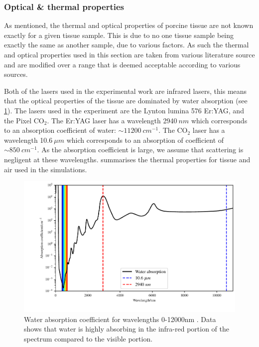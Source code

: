 \subsubsection{Optical \& thermal properties}

As mentioned, the thermal and optical properties of porcine tissue are not known exactly for a given tissue sample. This is due to no one tissue sample being exactly the same as another sample, due to various factors. As such the thermal and optical properties used in this section are taken from various literature source and are modified over a range that is deemed acceptable according to various sources.

Both of the lasers used in the experimental work are infrared lasers, this means that the optical properties of the tissue are dominated by water absorption (see \cref{fig:waterabsor}). The lasers used in the experiment are the Lynton lumina 576 Er:YAG, and the Pixel CO$_2$. The Er:YAG laser has a wavelength 2940$~nm$ which corresponds to an absorption coefficient of water: $\sim 11200~cm^{-1}$. The CO$_2$ laser has a wavelength 10.6$~\mu m$ which corresponds to an absorption of coefficient of $\sim 850~cm^{-1}$. As the absorption coefficient is large, we assume that scattering is negligent at these wavelengths.
 summarises the thermal properties for tissue and air used in the simulations.  

\begin{figure}	
	\centering
	\includegraphics[width=\columnwidth]{./ablation/images/water.pdf}
	\caption{Water absorption coefficient for wavelengths 0-12000nm \cite{segelstein1981complex}. Data shows that water is highly absorbing in the infra-red portion of the spectrum  compared to the visible portion.}
	\label{fig:waterabsor}
\end{figure}

